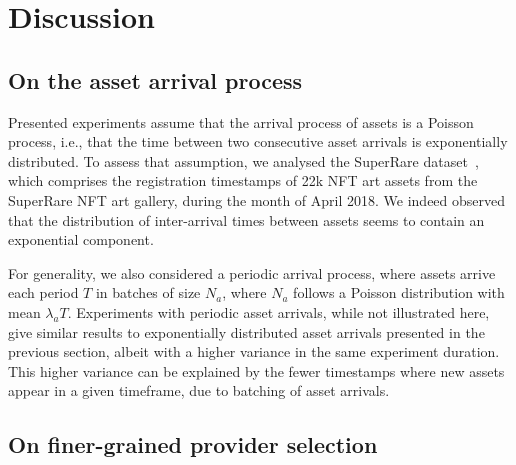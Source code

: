 \section{Discussion}\label{sec:discussion}

\subsection{On the asset arrival process}

Presented experiments assume that the arrival process of assets is a Poisson process, i.e., that the time between two consecutive asset arrivals is exponentially distributed.
To assess that assumption, we analysed the SuperRare dataset~\cite{superrare}, which comprises the registration timestamps of 22k NFT art assets from the SuperRare NFT art gallery, during the month of April 2018. 
We indeed observed that the distribution of inter-arrival times between assets seems to contain an exponential component.

For generality, we also considered a periodic arrival process, where assets arrive each period $T$ in batches of size $N_{a}$, where $N_{a}$ follows a Poisson distribution with mean $\lambda_{a}T$.
Experiments with periodic asset arrivals, while not illustrated here, give similar results to exponentially distributed asset arrivals presented in the previous section, albeit with a higher variance in the same experiment duration. 
This higher variance can be explained by the fewer timestamps where new assets appear in a given timeframe, due to batching of asset arrivals.

\subsection{On finer-grained provider selection}

